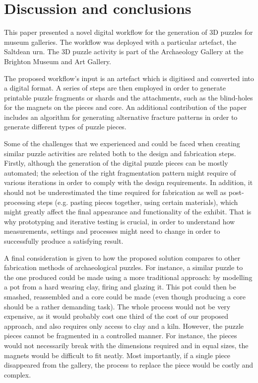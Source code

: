 \documentclass[acmlarge,screen,dvipsnames]{acmart}
\begin{document}
\greenEnd






\section{Discussion and conclusions}
\label{conclusions}

This paper presented a novel digital workflow for the generation of 3D
puzzles for museum galleries. The workflow was deployed with a
particular artefact, the Saltdean urn. The 3D puzzle activity is part
of the Archaeology Gallery at the Brighton Museum and Art Gallery.

The proposed workflow's input is an artefact which is digitised and
converted into a digital format. A series of steps are then employed
in order to generate printable puzzle fragments or shards and the
attachments, such as the blind-holes for the magnets on the pieces and
core. An additional contribution of the paper includes an algorithm
for generating alternative fracture patterns in order to generate
different types of puzzle pieces.

Some of the challenges that we experienced and could be faced when
creating similar puzzle activities are related both to the design and
fabrication steps. Firstly, although the generation of the digital
puzzle pieces can be mostly automated; the selection of the right
fragmentation pattern might require of various iterations in order to
comply with the design requirements. In addition, it should not be
underestimated the time required for fabrication as well as
post-processing steps (e.g. pasting pieces together, using certain
materials), which might greatly affect the final appearance and
functionality of the exhibit. That is why prototyping and iterative
testing is crucial, in order to understand how measurements, settings
and processes might need to change in order to successfully produce a
satisfying result.

\greenBegin

A final consideration is given to how the proposed solution compares
to other fabrication methods of archaeological puzzles. For instance,
a similar puzzle to the one produced could be made using a more
traditional approach: by modelling a pot from a hard wearing clay,
firing and glazing it. This pot could then be smashed, reassembled and
a core could be made (even though producing a core should be a rather
demanding task). The whole process would not be very expensive, as it
would probably cost one third of the cost of our proposed approach,
and also requires only access to clay and a kiln. However, the puzzle
pieces cannot be fragmented in a controlled manner. For instance, the
pieces would not necessarily break with the dimensions required and in
equal sizes, the magnets would be difficult to fit neatly. Most
importantly, if a single piece disappeared from the gallery, the
process to replace the piece would be costly and complex.
\end{document}
